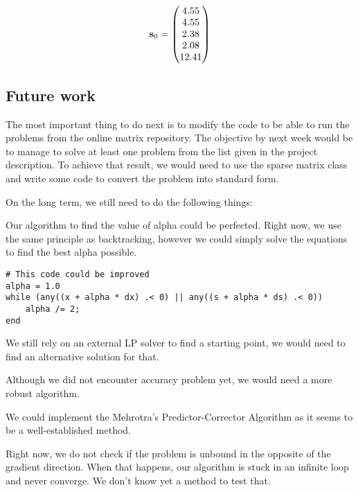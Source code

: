 \[
\boldsymbol{\mathrm{s}}_0 = \begin{pmatrix} 4.55 \\
4.55 \\
2.38 \\
2.08 \\
12.41 \end{pmatrix}
\]

\subsection{Future work}\label{section:future}

The most important thing to do next is to modify the code to be able to run the problems from the online matrix repository. The objective by next week would be to manage to solve at least one problem from the list given in the project description. To achieve that result, we would need to use the sparse matrix class and write some code to convert the problem into standard form.

On the long term, we still need to do the following things:

Our algorithm to find the value of alpha could be perfected. Right now, we use the same principle as backtracking, however we could simply solve the equations to find the best alpha possible.
\begin{lstlisting}
# This code could be improved
alpha = 1.0
while (any((x + alpha * dx) .< 0) || any((s + alpha * ds) .< 0))
    alpha /= 2;
end
\end{lstlisting}

We still rely on an external LP solver to find a starting point, we would need to find an alternative solution for that.

Although we did not encounter accuracy problem yet, we would need a more robust algorithm.

We could implement the Mehrotra's Predictor-Corrector Algorithm as it seems to be a well-established method.

Right now, we do not check if the problem is unbound in the opposite of the gradient direction. When that happens, our algorithm is stuck in an infinite loop and never converge. We don't know yet a method to test that.